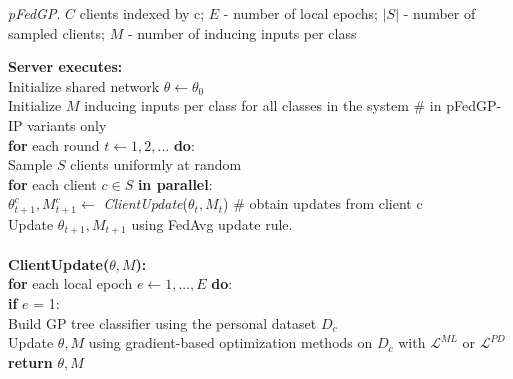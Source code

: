 \documentclass{article}
\begin{document}
\begin{algorithm}[!t] 
    \label{algo:pfedgp}
    \caption{\textit{pFedGP}. $C$ clients indexed by c; $E$ - number of local epochs; $|S|$ - number of sampled clients; $M$ - number of inducing inputs per class}
	\vspace{0.1cm}
	{\bf Server executes:}\\
	\hspace*{5mm} Initialize shared network $\theta \leftarrow \theta_0$\\
	\hspace*{5mm} Initialize $M$ inducing inputs per class for all classes in the system  \textcolor{OliveGreen}{\# in pFedGP-IP variants only}\\
	\hspace*{5mm} \textbf{for} each round $t \leftarrow 1, 2, ...$ \textbf{do}:\\
	\hspace*{10mm} Sample $S$ clients uniformly at random\\
	\hspace*{10mm} \textbf{for} each client $c \in S$ \textbf{in parallel}:\\
	\hspace*{15mm} $\theta_{t + 1}^c, M_{t+1}^c \leftarrow $ \textit{ClientUpdate}($\theta_t, M_t$) \textcolor{OliveGreen}{\# obtain updates from client c}\\
	\hspace*{10mm} Update  $\theta_{t + 1}, M_{t+1}$ using FedAvg \cite{mcmahan2017communication} update rule.
	\\~\\
	\textbf{ClientUpdate($\theta, M$):}\\
	\hspace*{5mm} \textbf{for} each local epoch $e \leftarrow 1, ..., E$ \textbf{do}:\\
	\hspace*{10mm} \textbf{if} $e$ = 1:\\
	\hspace*{15mm} Build GP tree classifier using the personal dataset $D_c$\\
	\hspace*{10mm} Update $\theta, M$ using gradient-based optimization methods on $D_c$ with $\mathcal{L}^{ML}$ or $\mathcal{L}^{PD}$\\
	\hspace*{5mm} \textbf{return} $\theta, M$
	
\end{algorithm}
\end{document}
